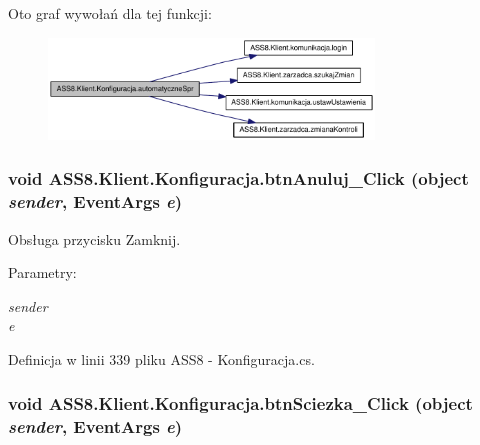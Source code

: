 Oto graf wywołań dla tej funkcji:\nopagebreak
\begin{figure}[H]
\begin{center}
\leavevmode
\includegraphics[width=245pt]{d2/de7/a00014_49a6172f91f2b718c2838960918afba7_cgraph}
\end{center}
\end{figure}
\hypertarget{a00014_f95affc14a6ee755996b87db35881a75}{
\subsubsection[{btnAnuluj\_\-Click}]{\setlength{\rightskip}{0pt plus 5cm}void ASS8.Klient.Konfiguracja.btnAnuluj\_\-Click (object {\em sender}, \/  EventArgs {\em e})}}
\label{d2/de7/a00014_f95affc14a6ee755996b87db35881a75}


Obsługa przycisku Zamknij. 

\begin{Desc}
\item[Parametry:]
\begin{description}
\item[{\em sender}]\item[{\em e}]\end{description}
\end{Desc}


Definicja w linii 339 pliku ASS8 - Konfiguracja.cs.\hypertarget{a00014_43e125d87ba2497d29d9ad6ea456c62d}{
\subsubsection[{btnSciezka\_\-Click}]{\setlength{\rightskip}{0pt plus 5cm}void ASS8.Klient.Konfiguracja.btnSciezka\_\-Click (object {\em sender}, \/  EventArgs {\em e})}}
\label{d2/de7/a00014_43e125d87ba2497d29d9ad6ea456c62d}



